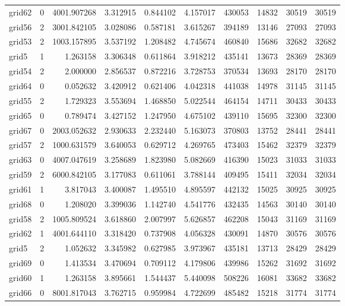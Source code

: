 \documentclass[../../../thesis.tex]{subfiles}
\begin{document}
\begin{longtable}{|l|r|r|r|r|r|r|r|r|r|}
grid62 & 0 & 4001.907268 & 3.312915 & 0.844102 & 4.157017 & 430053 & 14832 & 30519 & 30519 \\
grid56 & 2 & 3001.842105 & 3.028086 & 0.587181 & 3.615267 & 394189 & 13146 & 27093 & 27093 \\
grid53 & 2 & 1003.157895 & 3.537192 & 1.208482 & 4.745674 & 460840 & 15686 & 32682 & 32682 \\
grid5 & 1 & 1.263158 & 3.306348 & 0.611864 & 3.918212 & 435141 & 13673 & 28369 & 28369 \\
grid54 & 2 & 2.000000 & 2.856537 & 0.872216 & 3.728753 & 370534 & 13693 & 28170 & 28170 \\
grid64 & 0 & 0.052632 & 3.420912 & 0.621406 & 4.042318 & 441038 & 14978 & 31145 & 31145 \\
grid55 & 2 & 1.729323 & 3.553694 & 1.468850 & 5.022544 & 464154 & 14711 & 30433 & 30433 \\
grid65 & 0 & 0.789474 & 3.427152 & 1.247950 & 4.675102 & 439110 & 15695 & 32300 & 32300 \\
grid67 & 0 & 2003.052632 & 2.930633 & 2.232440 & 5.163073 & 370803 & 13752 & 28441 & 28441 \\
grid57 & 2 & 1000.631579 & 3.640053 & 0.629712 & 4.269765 & 473403 & 15462 & 32379 & 32379 \\
grid63 & 0 & 4007.047619 & 3.258689 & 1.823980 & 5.082669 & 416390 & 15023 & 31033 & 31033 \\
grid59 & 2 & 6000.842105 & 3.177083 & 0.611061 & 3.788144 & 409495 & 15411 & 32034 & 32034 \\
grid61 & 1 & 3.817043 & 3.400087 & 1.495510 & 4.895597 & 442132 & 15025 & 30925 & 30925 \\
grid68 & 0 & 1.208020 & 3.399036 & 1.142740 & 4.541776 & 432435 & 14563 & 30140 & 30140 \\
grid58 & 2 & 1005.809524 & 3.618860 & 2.007997 & 5.626857 & 462208 & 15043 & 31169 & 31169 \\
grid62 & 1 & 4001.644110 & 3.318420 & 0.737908 & 4.056328 & 430091 & 14870 & 30576 & 30576 \\
grid5 & 2 & 1.052632 & 3.345982 & 0.627985 & 3.973967 & 435181 & 13713 & 28429 & 28429 \\
grid69 & 0 & 1.413534 & 3.470694 & 0.709112 & 4.179806 & 439986 & 15262 & 31692 & 31692 \\
grid60 & 1 & 1.263158 & 3.895661 & 1.544437 & 5.440098 & 508226 & 16081 & 33682 & 33682 \\
grid66 & 0 & 8001.817043 & 3.762715 & 0.959984 & 4.722699 & 485482 & 15218 & 31774 & 31774 \\

\end{longtable}
\end{document}
